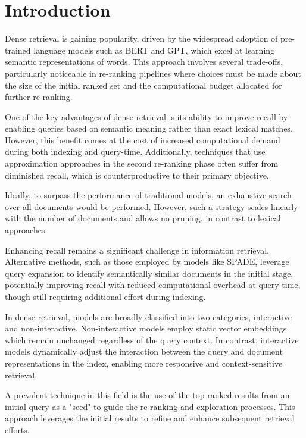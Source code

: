 \documentclass[sigconf,authorversion,nonacm]{acmart}
\begin{document}
\section{Introduction}

Dense retrieval is gaining popularity, driven by the widespread adoption of pre-trained language
models such as BERT and GPT, which excel at learning semantic representations of words. This approach
involves several trade-offs, particularly noticeable in re-ranking pipelines where choices must be
made about the size of the initial ranked set and the computational budget allocated for further
re-ranking.

One of the key advantages of dense retrieval is its ability to improve recall by enabling queries
based on semantic meaning rather than exact lexical matches. However, this benefit comes at the cost
of increased computational demand during both indexing and query-time. Additionally, techniques that
use approximation approaches in the second re-ranking phase often suffer from diminished recall,
which is counterproductive to their primary objective.

Ideally, to surpass the performance of traditional models, an exhaustive search over all documents
would be performed. However, such a strategy scales linearly with the number of documents and allows
no pruning, in contrast to lexical approaches.

Enhancing recall remains a significant challenge in information retrieval. Alternative methods, such
as those employed by models like SPADE\cite{spade}, leverage query expansion to identify semantically similar
documents in the initial stage, potentially improving recall with reduced computational overhead at
query-time, though still requiring additional effort during indexing.

In dense retrieval, models are broadly classified into two categories, interactive and
non-interactive. Non-interactive models employ static vector embeddings which remain unchanged
regardless of the query context. In contrast, interactive models dynamically adjust the interaction
between the query and document representations in the index, enabling more responsive and
context-sensitive retrieval.

A prevalent technique in this field is the use of the top-ranked results from an initial query as a
"seed" to guide the re-ranking and exploration processes. This approach leverages the initial
results to refine and enhance subsequent retrieval efforts.
\end{document}
